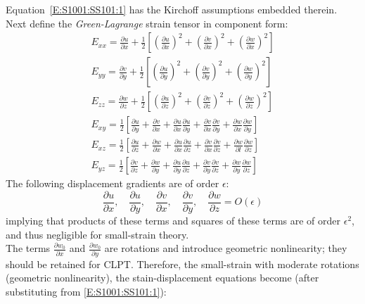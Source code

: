 \documentclass[11pt,letterpaper,titlepage,draft]{article}
\newcommand{\PDer}[2]{\frac{\partial #1}{\partial #2}}
\numberwithin{equation}{subsection}
\begin{document}
Equation~\ref{E:S1001:SS101:1} has the Kirchoff assumptions embedded therein.
Next define the \emph{Green-Lagrange} strain tensor in component form:
    \begin{eqnarray}\label{E:S1001:SS101:2}
    E_{xx} = \PDer{u}{x} + \frac{1}{2}\left[ \left(\PDer{u}{x}\right)^2 + 
    \left(\PDer{v}{x}\right)^2 + \left(\PDer{w}{x}\right)^2 \right]
\\
    E_{yy} = \PDer{v}{y} + \frac{1}{2}\left[ \left(\PDer{u}{y}\right)^2 + 
    \left(\PDer{v}{y}\right)^2 + \left(\PDer{w}{y}\right)^2 \right]
\\
    E_{zz} = \PDer{w}{z} + \frac{1}{2}\left[ \left(\PDer{u}{z} \right)^2 + 
    \left(\PDer{v}{z}\right)^2 + \left(\PDer{w}{z}\right)^2 \right]
\\
    E_{xy} = \frac{1}{2}\left[ \PDer{u}{y} + \PDer{v}{x} + \PDer{u}{x} \PDer{u}{y}
    + \PDer{v}{x} \PDer{v}{y} + \PDer{w}{x} \PDer{w}{y} \right]
\\
    E_{xz} = \frac{1}{2}\left[ \PDer{u}{z} + \PDer{w}{x} + \PDer{u}{x} \PDer{u}{z}
    + \PDer{v}{x} \PDer{v}{z} + \PDer{w}{l} \PDer{w}{z} \right]
\\
    E_{yz} = \frac{1}{2}\left[ \PDer{v}{z} + \PDer{w}{y} + \PDer{u}{y} \PDer{u}{z}
    + \PDer{v}{y} \PDer{v}{z} + \PDer{w}{y} \PDer{w}{z} \right]
\end{eqnarray}
The following displacement gradients are of order $\epsilon$:
\begin{equation}\label{E:S1001:SS101:3}
\PDer{u}{x},\quad \PDer{u}{y}, \quad \PDer{v}{x}, \quad \PDer{v}{y}, \quad \PDer{w}{z} = O(\epsilon)
\end{equation}
implying that products of these terms and squares of these terms are of order $\epsilon^2$, 
and thus negligible for small-strain theory.
\\
The terms $\PDer{w_0}{x}$ and $\PDer{w_0}{y}$ are rotations and introduce 
geometric nonlinearity; they should be retained for CLPT.
Therefore, the small-strain with moderate rotations (geometric nonlinearity), 
the stain-displacement equations become (after substituting from \ref{E:S1001:SS101:1}):
\end{document}
